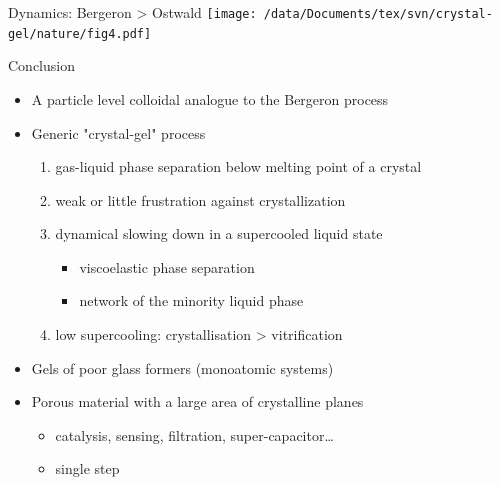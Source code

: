 \documentclass[xcolor=table]{beamer}
\begin{document}
\begin{frame}{Dynamics: Bergeron > Ostwald}
\vspace{\baselineskip}
\texttt{[image: /data/Documents/tex/svn/crystal-gel/nature/fig4.pdf]}
\end{frame}

\begin{frame}{Conclusion}
	\begin{itemize}
		\item A particle level colloidal analogue to the Bergeron process
		\item Generic "crystal-gel" process
		\begin{enumerate}
			\item gas-liquid phase separation below melting point
		of a crystal
			\item weak or little frustration against crystallization
			\item dynamical slowing down in a supercooled liquid state
			\begin{itemize}
				\item viscoelastic phase separation
				\item network of the minority liquid phase
			\end{itemize}
			\item low supercooling: crystallisation > vitrification
		\end{enumerate}
		\item Gels of poor glass formers (monoatomic systems)
		\item Porous material with a large area of crystalline planes
		\begin{itemize}
			\item catalysis, sensing, filtration, super-capacitor\ldots
			\item single step
		\end{itemize}
	\end{itemize}
\end{frame}

\appendix
{}
\setcounter{finalframe}{\value{framenumber}}

\begin{frame}[plain]
\end{frame}

\setcounter{framenumber}{\value{finalframe}}
\end{document}
